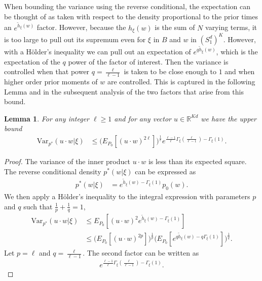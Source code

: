 \documentclass{article}
\numberwithin{equation}{section}
\theoremstyle{Lemma}
\newtheorem{lemma}{Lemma}
\theoremstyle{Corollary}
\theoremstyle{Theorem}
\theoremstyle{Remark}
\begin{document}
When bounding the variance using the reverse conditional, the expectation can be thought of as taken with respect to the density proportional to the prior times an $e^{\tilde {h}_{\xi}(w)}$ factor. However, because the $h_{\xi}(w)$ is the sum of $N$ varying terms, it is too large to pull out its supremum even for $\xi$ in $B$ and $w$ in $(S_1^d)^K$.  However, with a H{\"o}lder's inequality we can pull out an expectation of $e^{q\tilde {h}_{\xi}(w)}$, which is the expectation of the $q$ power of the factor of interest. Then the variance is controlled when that power $q=\tfrac{\ell}{\ell-1}$  is taken to be close enough to $1$ and when higher order prior moments of $w$ are controlled.  This is captured in the following Lemma and in the subsequent analysis of the two factors that arise from this bound.

    \begin{lemma}\label{holder_main}
        For any integer $\ell \geq 1$ and for any vector $u \in \mathbb{R}^{Kd}$ we have the upper bound
        \begin{align}
            \text{Var}_{p^{*}}(u \cdot w|\xi)& \leq \Big(E_{P_{0}}[(u \cdot w)^{2\ell}]\Big)^{\frac{1}{\ell}}e^{\frac{\ell-1}{\ell}\Gamma_{\xi}(\frac{\ell}{\ell-1})-\Gamma_{\xi}(1)}.\label{holder_eqn}
        \end{align}
    \end{lemma}
    \begin{proof}
        The variance of the inner product $u \cdot w$ is less than its expected square. The reverse conditional density $p^{*}(w|\xi)$ can be expressed as
        \begin{align}
            p^{*}(w|\xi)&= e^{\tilde{h}_{\xi}(w)-\Gamma_{\xi}(1)}p_{0}(w).
        \end{align}
        We then apply a H{\"o}lder's inequality to the integral expression with parameters $p$ and $q$ such that $\frac{1}{p}+\frac{1}{q}=1$,
    \begin{align}
       \text{Var}_{p^{*}}(u \cdot w|\xi)&\leq E_{P_{0}}[(u \cdot w)^{2}e^{\tilde{h}_{\xi}(w)-\Gamma_{\xi}(1)}]\\
       & \leq \Big(E_{P_{0}}[(u \cdot w)^{2p}]\Big)^{\frac{1}{p}}\Big(E_{P_{0}}[e^{q \tilde{h}_{\xi}(w)-q\Gamma_{\xi}(1)}] \Big)^{\frac{1}{q}}.
    \end{align}
    Let $p = \ell$ and $q = \frac{\ell}{\ell-1}$. The second factor can be written as
    \begin{align}
  e^{\frac{\ell-1}{\ell}\Gamma_{\xi}(\frac{\ell}{\ell-1})-\Gamma_{\xi}(1)}.
    \end{align}
\end{proof}
\end{document}
